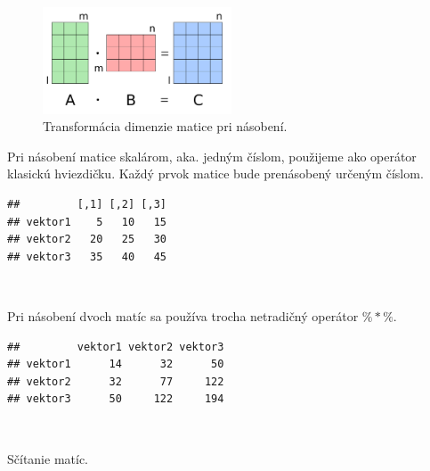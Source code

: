 \begin{figure}
\begin{center}
\includegraphics[width=0.5\textwidth,height=\textheight]{diplomka obrazky/4a.png}
\caption{Transformácia dimenzie matice pri násobení.}
\end{center}
\end{figure}

Pri násobení matice skalárom, aka. jedným číslom, použijeme ako operátor
klasickú hviezdičku. Každý prvok matice bude prenásobený určeným číslom.

\begin{Shaded}
\begin{Highlighting}[]
\OperatorTok{*}\StringTok{ }
\end{Highlighting}
\end{Shaded}

\begin{verbatim}
##         [,1] [,2] [,3]
## vektor1    5   10   15
## vektor2   20   25   30
## vektor3   35   40   45
\end{verbatim}

~

Pri násobení dvoch matíc sa používa trocha netradičný operátor
\(\%*\%\).

\begin{Shaded}
\end{Shaded}

\begin{verbatim}
##         vektor1 vektor2 vektor3
## vektor1      14      32      50
## vektor2      32      77     122
## vektor3      50     122     194
\end{verbatim}

~

Sčítanie matíc.

\begin{Shaded}
\begin{Highlighting}[]
\OperatorTok{+}\StringTok{ }
\end{Highlighting}
\end{Shaded}

